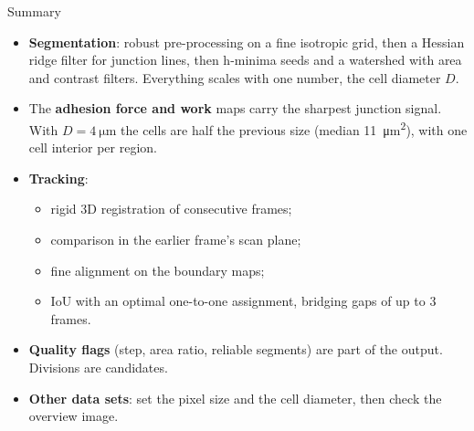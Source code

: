 \documentclass[aspectratio=169,9pt]{beamer}
\begin{document}
\begin{frame}{Summary}
\begin{itemize}
\item \textbf{Segmentation}: robust pre-processing on a fine isotropic grid, then a Hessian ridge filter for junction lines, then h-minima seeds and a watershed with area and contrast filters. Everything scales with one number, the cell diameter $D$.
\item The \textbf{adhesion force and work} maps carry the sharpest junction signal. With $D=\SI{4}{\micro\metre}$ the cells are half the previous size (median \SI{11}{\micro\metre\squared}), with one cell interior per region.
\item \textbf{Tracking}:
 \begin{itemize}
 \item rigid 3D registration of consecutive frames;
 \item comparison in the earlier frame's scan plane;
 \item fine alignment on the boundary maps;
 \item IoU with an optimal one-to-one assignment, bridging gaps of up to 3 frames.
 \end{itemize}
\item \textbf{Quality flags} (step, area ratio, reliable segments) are part of the output. Divisions are candidates.
\item \textbf{Other data sets}: set the pixel size and the cell diameter, then check the overview image.
\end{itemize}
\end{frame}
\end{document}
